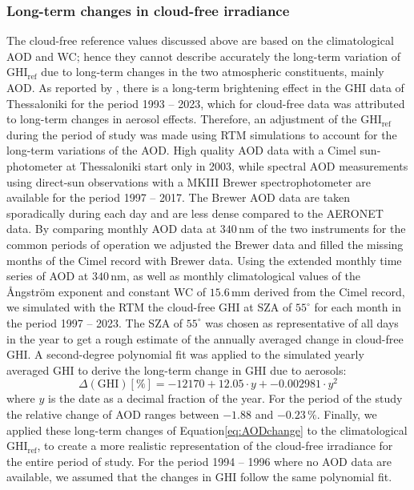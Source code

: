 \documentclass[preprint, 5p,
authoryear]{elsarticle} %
\begin{document}
\hypertarget{long-term-changes-in-cloud-free-irradiance}{%
\subsubsection{Long-term changes in cloud-free
irradiance}\label{long-term-changes-in-cloud-free-irradiance}}

The cloud-free reference values discussed above are based on the
climatological AOD and WC; hence they cannot describe accurately the
long-term variation of \(\text{GHI}_\text{ref}\) due to long-term
changes in the two atmospheric constituents, mainly AOD. As reported by
\citet{Natsis2023}, there is a long-term brightening effect in the GHI
data of Thessaloniki for the period 1993 -- 2023, which for cloud-free
data was attributed to long-term changes in aerosol effects. Therefore,
an adjustment of the \(\text{GHI}_\text{ref}\) during the period of
study was made using RTM simulations to account for the long-term
variations of the AOD. High quality AOD data with a Cimel sun-photometer
at Thessaloniki start only in 2003, while spectral AOD measurements
using direct-sun observations with a MKIII Brewer spectrophotometer are
available for the period 1997 -- 2017. The Brewer AOD data are taken
sporadically during each day and are less dense compared to the AERONET
data. By comparing monthly AOD data at \(340\,\text{nm}\) of the two
instruments for the common periods of operation we adjusted the Brewer
data and filled the missing months of the Cimel record with Brewer data.
Using the extended monthly time series of AOD at \(340\,\text{nm}\), as
well as monthly climatological values of the Ångström exponent and
constant WC of \(15.6\,\text{mm}\) derived from the Cimel record, we
simulated with the RTM the cloud-free GHI at SZA of \(55^\circ\) for
each month in the period 1997 -- 2023. The SZA of \(55^\circ\) was
chosen as representative of all days in the year to get a rough estimate
of the annually averaged change in cloud-free GHI. A second-degree
polynomial fit was applied to the simulated yearly averaged GHI to
derive the long-term change in GHI due to aerosols: \begin{equation}
\Delta(\text{GHI}) [\%] = -12170 + 12.05 \cdot y + -0.002981 \cdot y^2 \label{eq:AODchange}
\end{equation} where \(y\) is the date as a decimal fraction of the
year. For the period of the study the relative change of AOD ranges
between \(-1.88\) and \(-0.23\,\%\). Finally, we applied these long-term
changes of Equation\nobreakspace{}\ref{eq:AODchange} to the
climatological \(\text{GHI}_\text{ref}\), to create a more realistic
representation of the cloud-free irradiance for the entire period of
study. For the period 1994 -- 1996 where no AOD data are available, we
assumed that the changes in GHI follow the same polynomial fit.
\end{document}
